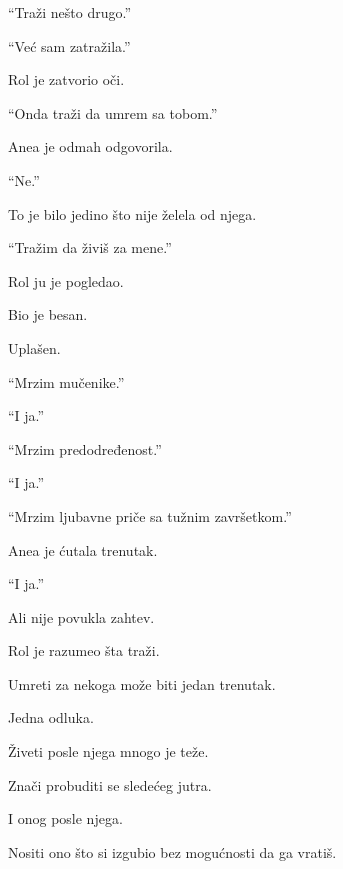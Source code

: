 \bigskip

``Traži nešto drugo.''

\bigskip

``Već sam zatražila.''

\bigskip

Rol je zatvorio oči.

``Onda traži da umrem sa tobom.''

\bigskip

Anea je odmah odgovorila.

``Ne.''

\bigskip

To je bilo jedino što nije želela od njega.

\bigskip

``Tražim da živiš za mene.''

\bigskip

Rol ju je pogledao.

\bigskip

Bio je besan.

Uplašen.

\bigskip

``Mrzim mučenike.''

``I ja.''

\bigskip

``Mrzim predodređenost.''

``I ja.''

\bigskip

``Mrzim ljubavne priče sa tužnim završetkom.''

\bigskip

Anea je ćutala trenutak.

``I ja.''

\bigskip

Ali nije povukla zahtev.

\bigskip

Rol je razumeo šta traži.

\bigskip

Umreti za nekoga može biti jedan trenutak.

Jedna odluka.

\bigskip

Živeti posle njega mnogo je teže.

\bigskip

Znači probuditi se sledećeg jutra.

I onog posle njega.

\bigskip

Nositi ono što si izgubio bez mogućnosti da ga vratiš.

